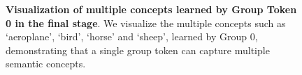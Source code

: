 
\begin{figure}[thp]
\centering
  \vspace{-0.5em}


\caption[\textbf{Visualization of multiple concepts learned by a Group Token}]{\textbf{Visualization of multiple concepts learned by Group Token 0 in the final stage}. We visualize 
 the multiple concepts such as `aeroplane', `bird', `horse' and `sheep', learned by Group 0, demonstrating that a single group token can capture multiple semantic concepts. }
\label{fig:multiconceptslearnedbygt}
\end{figure}